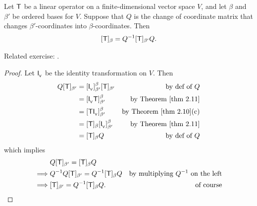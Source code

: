 \begin{theorem} \label{thm 2.23}
Let \(\textsf{T}\) be a linear operator on a finite-dimensional vector space \(V\),
and let \(\beta\) and \(\beta'\) be ordered bases for \(V\).
Suppose that \(Q\) is the change of coordinate matrix that changes \(\beta'\)-coordinates into \(\beta\)-coordinates.
Then
\[
    [\textsf{T}]_{\beta} = Q^{-1} [\textsf{T}]_{\beta'} Q.
\]
\end{theorem}

\begin{note}
Related exercise: .
\end{note}

\begin{proof}
Let \(\textsf{I}_{_{\textsf{V}}}\) be the identity transformation on \(V\).
Then
\begin{align*}
    Q [\T]_{\beta'} & = [\ITRANV]_{\beta'}^{\beta} [\T]_{\beta'} & \text{by def of \(Q\)} \\
                    & = [\ITRANV \T]_{\beta'}^{\beta} & \text{by \THM{2.11}} \\
                    & = [\T \ITRANV]_{\beta'}^{\beta} & \text{by \THM{2.10}(c)} \\
                    & = [\T]_{\beta} [\ITRANV]_{\beta'}^{\beta} & \text{by \THM{2.11}} \\
                    & = [\T]_{\beta} Q & \text{by def of \(Q\)}
\end{align*}
which implies
\begin{align*}
             & Q [\textsf{T}]_{\beta'} = [\textsf{T}]_{\beta} Q \\
    \implies & Q^{-1} Q [\textsf{T}]_{\beta'} = Q^{-1} [\textsf{T}]_{\beta} Q & \text{by multiplying \(Q^{-1}\) on the left} \\
    \implies & [\textsf{T}]_{\beta'} = Q^{-1} [\textsf{T}]_{\beta} Q. & \text{of course}
\end{align*}
\end{proof}

